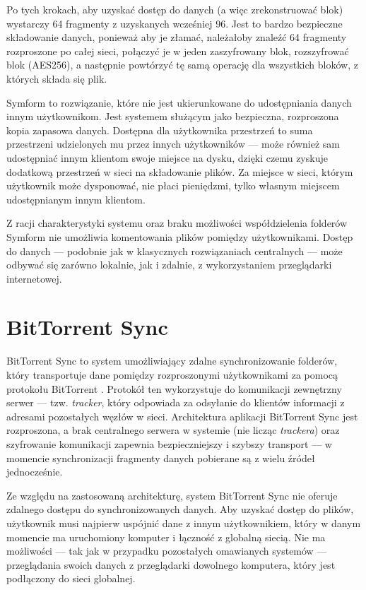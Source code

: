 \documentclass[polish,a4paper,twoside]{ppfcmthesis}
\begin{document}
Po tych krokach, aby uzyskać dostęp do danych (a więc zrekonstruować blok) wystarczy 64 fragmenty z uzyskanych wcześniej 96. Jest to bardzo bezpieczne składowanie danych, ponieważ aby je złamać, należałoby znaleźć 64 fragmenty rozproszone po całej sieci, połączyć je w jeden zaszyfrowany blok, rozszyfrować blok (AES256), a następnie powtórzyć tę samą operację dla wszystkich bloków, z których składa się plik.

Symform to rozwiązanie, które nie jest ukierunkowane do udostępniania danych innym użytkownikom. Jest systemem służącym jako bezpieczna, rozproszona kopia zapasowa danych. Dostępna dla użytkownika przestrzeń to suma przestrzeni udzielonych mu przez innych użytkowników --- może również sam udostępniać innym klientom swoje miejsce na dysku, dzięki czemu zyskuje dodatkową przestrzeń w sieci na składowanie plików. Za miejsce w sieci, którym użytkownik może dysponować, nie płaci pieniędzmi, tylko własnym miejscem udostępnianym innym klientom.

Z racji charakterystyki systemu oraz braku możliwości współdzielenia folderów Symform nie umożliwia komentowania plików pomiędzy użytkownikami. Dostęp do danych --- podobnie jak w klasycznych rozwiązaniach centralnych --- może odbywać się zarówno lokalnie, jak i zdalnie, z wykorzystaniem przeglądarki internetowej.

\section*{BitTorrent Sync}

BitTorrent Sync \cite{btsync} to system umożliwiający zdalne synchronizowanie folderów, który transportuje dane pomiędzy rozproszonymi użytkownikami za pomocą protokołu BitTorrent \cite{bittorrentlib}. Protokół ten wykorzystuje do komunikacji zewnętrzny serwer --- tzw. \emph{tracker}, który odpowiada za odsyłanie do klientów informacji z adresami pozostałych węzłów w sieci. Architektura aplikacji BitTorrent Sync jest rozproszona, a brak centralnego serwera w systemie (nie licząc \emph{trackera}) oraz szyfrowanie komunikacji zapewnia bezpieczniejszy i szybszy transport --- w momencie synchronizacji fragmenty danych pobierane są z wielu źródeł jednocześnie.

Ze względu na zastosowaną architekturę, system BitTorrent Sync nie oferuje zdalnego dostępu do synchronizowanych danych. Aby uzyskać dostęp do plików, użytkownik musi najpierw uspójnić dane z innym użytkownikiem, który w danym momencie ma uruchomiony komputer i łączność z globalną siecią. Nie ma możliwości --- tak jak w przypadku pozostałych omawianych systemów --- przeglądania swoich danych z przeglądarki dowolnego komputera, który jest podłączony do sieci globalnej.
\end{document}
